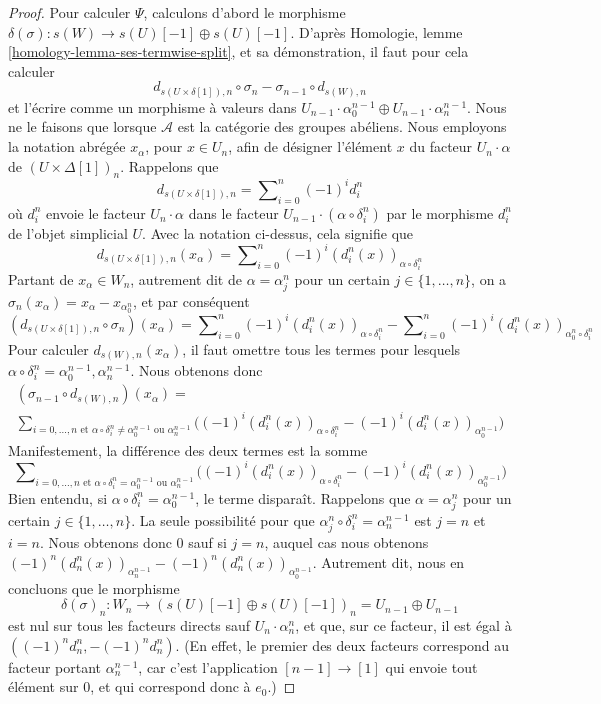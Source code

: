 \begin{proof}
\medskip\noindent
Pour calculer $\Psi$, calculons d'abord le morphisme
$\delta(\sigma) : s(W) \to s(U)[-1] \oplus s(U)[-1]$.
D'après Homologie, lemme \ref{homology-lemma-ses-termwise-split}, et sa
démonstration, il faut pour cela calculer
$$
d_{s(U \times \delta[1]), n} \circ \sigma_n
-
\sigma_{n - 1} \circ d_{s(W), n}
$$
et l'écrire comme un morphisme à valeurs dans
$U_{n - 1} \cdot \alpha^{n - 1}_0 \oplus U_{n - 1} \cdot \alpha^{n - 1}_n$.
Nous ne le faisons que lorsque $\mathcal{A}$ est la catégorie des groupes
abéliens. Nous employons la notation abrégée $x_{\alpha}$, pour $x \in U_n$,
afin de désigner l'élément $x$ du facteur $U_n \cdot \alpha$ de
$(U \times \Delta[1])_n$. Rappelons que
$$
d_{s(U \times \delta[1]), n}
=
\sum\nolimits_{i = 0}^n (-1)^i d^n_i
$$
où $d^n_i$ envoie le facteur $U_n \cdot \alpha$ dans le facteur
$U_{n - 1} \cdot (\alpha \circ \delta^n_i)$ par le morphisme $d^n_i$
de l'objet simplicial $U$. Avec la notation ci-dessus, cela signifie que
$$
d_{s(U \times \delta[1]), n}(x_\alpha) =
\sum\nolimits_{i = 0}^n (-1)^i (d^n_i(x))_{\alpha \circ \delta^n_i}
$$
Partant de $x_\alpha \in W_n$, autrement dit de $\alpha = \alpha^n_j$
pour un certain $j \in \{1, \ldots, n\}$, on a
$\sigma_n(x_\alpha) = x_\alpha - x_{\alpha^n_0}$, et par conséquent
$$
(d_{s(U \times \delta[1]), n} \circ \sigma_n)(x_\alpha)
=
\sum\nolimits_{i = 0}^n (-1)^i (d^n_i(x))_{\alpha \circ \delta^n_i}
-
\sum\nolimits_{i = 0}^n (-1)^i (d^n_i(x))_{\alpha^n_0 \circ \delta^n_i}
$$
Pour calculer $d_{s(W), n}(x_\alpha)$, il faut omettre tous les termes pour
lesquels $\alpha \circ \delta^n_i = \alpha^{n - 1}_0, \alpha^{n - 1}_n$.
Nous obtenons donc
$$
\begin{matrix}
(\sigma_{n - 1} \circ d_{s(W), n})(x_\alpha) = \\
\sum\nolimits_{i = 0, \ldots, n\text{ et }
\alpha \circ \delta^n_i \not = \alpha^{n - 1}_0\text{ ou }\alpha^{n - 1}_n}
\Big((-1)^i (d^n_i(x))_{\alpha \circ \delta^n_i}
-
(-1)^i (d^n_i(x))_{\alpha^{n - 1}_0}
\Big)
\end{matrix}
$$
Manifestement, la différence des deux termes est la somme
$$
\sum\nolimits_{i = 0, \ldots, n\text{ et }
\alpha \circ \delta^n_i = \alpha^{n - 1}_0\text{ ou }\alpha^{n - 1}_n}
\Big((-1)^i (d^n_i(x))_{\alpha \circ \delta^n_i}
-
(-1)^i (d^n_i(x))_{\alpha^{n - 1}_0}
\Big)
$$
Bien entendu, si $\alpha \circ \delta^n_i = \alpha^{n - 1}_0$,
le terme disparaît. Rappelons que $\alpha = \alpha^n_j$
pour un certain $j \in \{1, \ldots, n\}$. La seule possibilité pour que
$\alpha^n_j \circ \delta^n_i = \alpha^{n - 1}_n$ est
$j = n$ et $i = n$. Nous obtenons donc $0$ sauf si $j = n$, auquel cas
nous obtenons
$(-1)^n(d^n_n(x))_{\alpha^{n - 1}_n} - (-1)^n(d^n_n(x))_{\alpha^{n - 1}_0}$.
Autrement dit, nous en concluons que le morphisme
$$
\delta(\sigma)_n :
W_n
\to
(s(U)[-1] \oplus s(U)[-1])_n = U_{n - 1} \oplus U_{n - 1}
$$
est nul sur tous les facteurs directs sauf $U_n \cdot \alpha^n_n$, et que,
sur ce facteur, il est égal à $((-1)^nd^n_n, -(-1)^nd^n_n)$.
(En effet, le premier des deux facteurs correspond au facteur portant
$\alpha^{n - 1}_n$, car c'est l'application $[n - 1] \to [1]$ qui envoie
tout élément sur $0$, et qui correspond donc à $e_0$.)


\end{proof}
